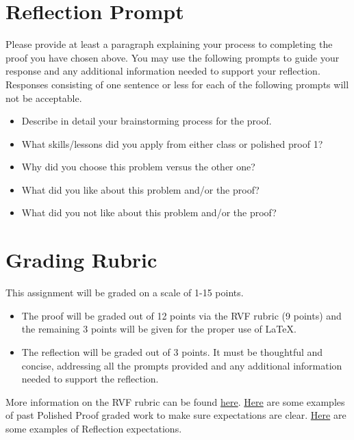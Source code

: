 \documentclass{article}
\theoremstyle{definition}
\begin{document}
\section*{Reflection Prompt}
    Please provide at least a paragraph explaining your process to completing the proof you have chosen above. You may use the following prompts to guide your response and any additional information needed to support your reflection. Responses consisting of one sentence or less for each of the following prompts will not be acceptable.
    \begin{itemize}
        \item Describe in detail your brainstorming process for the proof.
        \item What skills/lessons did you apply from either class or polished proof 1?
        \item Why did you choose this problem versus the other one?
        \item What did you like about this problem and/or the proof?
        \item What did you not like about this problem and/or the proof?
    \end{itemize}

\section*{Grading Rubric}
    This assignment will be graded on a scale of 1-15 points.
    \begin{itemize}
    \item The proof will be graded out of 12 points via the RVF rubric (9 points) and the remaining 3 points will be given for the proper use of \LaTeX.
    \item The reflection will be graded out of 3 points. It must be thoughtful and concise, addressing all the prompts provided and any additional information needed to support the reflection.
    \end{itemize}
     
    More information on the RVF rubric can be found 
    \href{https://drive.google.com/file/d/1P0OBjw-GkX64uCpYcqYmXARapf9MwaiI/view?usp=sharing}{here}. 
    \href{https://drive.google.com/file/d/14zLx8TDPdD8shbwgMGPAAWdQrUZDz1jd/view?usp=share_link}{Here} 
    are some examples of past Polished Proof graded work to make sure expectations are clear. \href{https://docs.google.com/document/d/1GcCZI_ueOWXlBC9xIBietOw1uEzFIyg-TzuHvbCZumU/edit?usp=sharing}{Here} are some examples of Reflection expectations.


	
\end{document}

